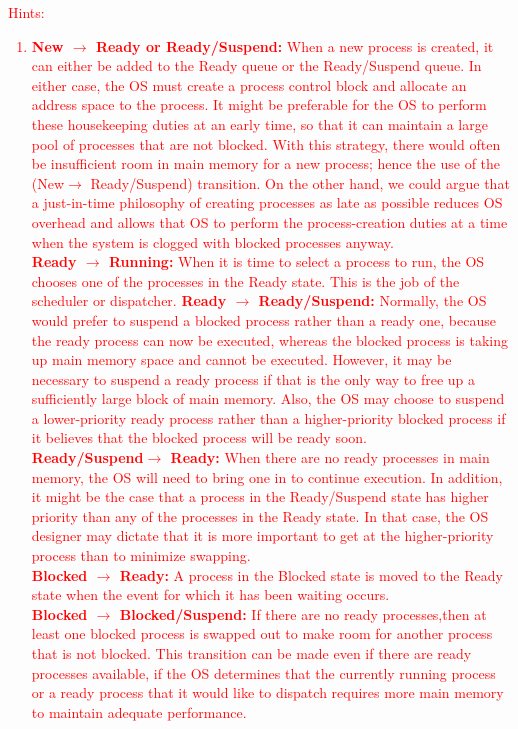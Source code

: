 \documentclass[12pt]{article}
\newenvironment{sol}[1][Solution]{\begin{trivlist}\item[\hskip\labelsep {\bfseries #1:}]}{\end{trivlist}}
\begin{document}
\begin{enumerate}
\begin{sol}
\end{sol}
\textcolor{red}{Hints: 
\begin{enumerate}
    \item \textbf{New $\rightarrow$ Ready or Ready/Suspend:} When a new process is created, it can either be added to the Ready queue or the Ready/Suspend queue. In either case, the OS must create a process control block and allocate an address space to the process. It might be preferable for the OS to perform these housekeeping duties at an early time, so that it can maintain a large pool of processes that are not blocked. With this strategy, there would often be insufficient room in main memory for a new process; hence the use of the (New$\rightarrow$ Ready/Suspend) transition. On the other hand, we could argue that a just-in-time philosophy of creating processes as late as possible reduces OS overhead and allows that OS to perform the process-creation duties at a time when the system is clogged with blocked processes anyway.\\
    \textbf{Ready $\rightarrow$ Running:} When it is time to select a process to run, the OS chooses one of the processes in the Ready state. This is the job of the scheduler or dispatcher. 
    \textbf{Ready $\rightarrow$ Ready/Suspend:} Normally, the OS would prefer to suspend a blocked process rather than a ready one, because the ready process can now be executed, whereas the blocked process is taking up main memory space and cannot be executed. However, it may be necessary to suspend a ready process if that is the only way to free up a sufficiently large block of main memory. Also, the OS may choose to suspend a lower-priority ready process rather than a higher-priority blocked process if it believes that the blocked process will be ready soon. \\
    \textbf{Ready/Suspend$\rightarrow$ Ready:} When there are no ready processes in main memory, the OS will need to bring one in to continue execution. In addition, it might be the case that a process in the Ready/Suspend state has higher priority than any of the processes in the Ready state. In that case, the OS designer may dictate that it is more important to get at the higher-priority process than to minimize swapping.\\
    \textbf{Blocked $\rightarrow$ Ready:} A process in the Blocked state is moved to the Ready state when the event for which it has been waiting occurs.\\
    \textbf{Blocked $\rightarrow$ Blocked/Suspend: }If there are no ready processes,then at least one blocked process is swapped out to make room for another process that is not blocked. This transition can be made even if there are ready processes available, if the OS determines that the currently running process or a ready process that it would like to dispatch requires more main memory to maintain adequate performance.\\ 

\end{enumerate}}
\end{enumerate}
\end{document}
